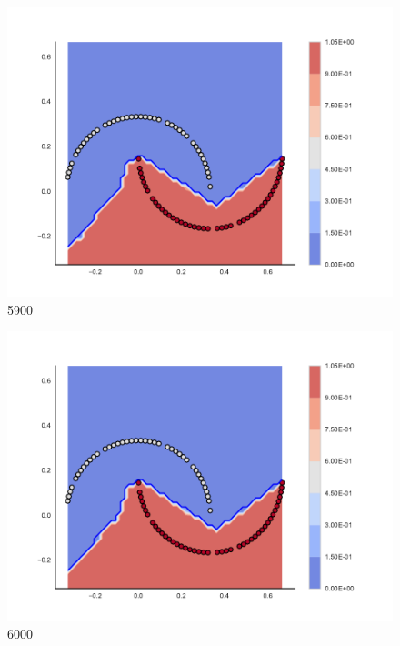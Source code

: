 \begin{subfigure}[b]{0.09\textwidth}
    \includegraphics[clip, trim=2.35cm 1.75cm 4.5cm 0cm,width=\textwidth]{img/convergence/5900.pdf}
    \caption{5900}
    \label{fig:convergence_5900}
\end{subfigure}
%
\begin{subfigure}[b]{0.09\textwidth}
    \includegraphics[clip, trim=2.35cm 1.75cm 4.5cm 0cm,width=\textwidth]{img/convergence/6000.pdf}
    \caption{6000}
    \label{fig:convergence_6000}
\end{subfigure}
%
